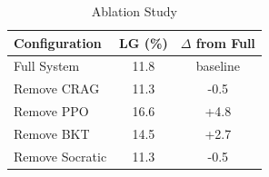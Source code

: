 \begin{table}[htbp]
\centering
\caption{Ablation Study}
\label{tab:ablation}
\begin{tabular}{lcc}
\toprule
Configuration & LG (\%) & $\Delta$ from Full \\
\midrule
Full System & 11.8 & baseline \\
Remove CRAG & 11.3 & -0.5 \\
Remove PPO & 16.6 & +4.8 \\
Remove BKT & 14.5 & +2.7 \\
Remove Socratic & 11.3 & -0.5 \\
\bottomrule
\end{tabular}
\end{table}
